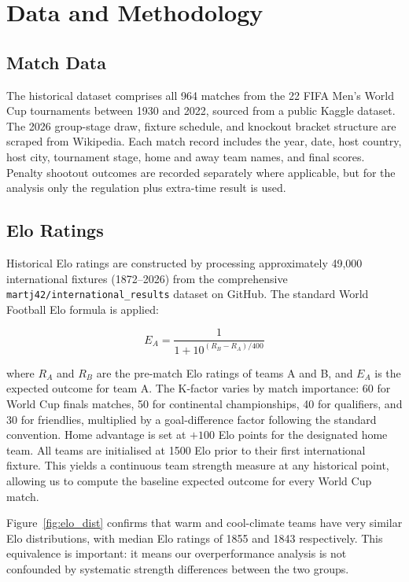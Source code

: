 \documentclass[11pt,a4paper]{article}
\begin{document}
\newpage

\section{Data and Methodology}

\subsection{Match Data}
The historical dataset comprises all 964 matches from the 22 FIFA Men's World Cup tournaments between 1930 and 2022, sourced from a public Kaggle dataset. The 2026 group-stage draw, fixture schedule, and knockout bracket structure are scraped from Wikipedia. Each match record includes the year, date, host country, host city, tournament stage, home and away team names, and final scores. Penalty shootout outcomes are recorded separately where applicable, but for the analysis only the regulation plus extra-time result is used.

\subsection{Elo Ratings}
Historical Elo ratings are constructed by processing approximately 49,000 international fixtures (1872--2026) from the comprehensive \texttt{martj42/international\_results} dataset on GitHub. The standard World Football Elo formula is applied:

\begin{equation}
    E_A = \frac{1}{1 + 10^{(R_B - R_A) / 400}}
\end{equation}

where $R_A$ and $R_B$ are the pre-match Elo ratings of teams A and B, and $E_A$ is the expected outcome for team A. The K-factor varies by match importance: 60 for World Cup finals matches, 50 for continental championships, 40 for qualifiers, and 30 for friendlies, multiplied by a goal-difference factor following the standard convention. Home advantage is set at $+100$ Elo points for the designated home team. All teams are initialised at 1500 Elo prior to their first international fixture. This yields a continuous team strength measure at any historical point, allowing us to compute the baseline expected outcome for every World Cup match.

Figure~\ref{fig:elo_dist} confirms that warm and cool-climate teams have very similar Elo distributions, with median Elo ratings of 1855 and 1843 respectively. This equivalence is important: it means our overperformance analysis is not confounded by systematic strength differences between the two groups.
\end{document}
